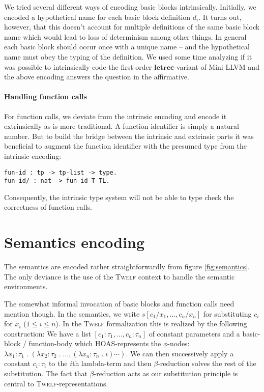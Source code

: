 \documentclass[a4paper, oneside, 10pt, final]{memoir}
\newcommand{\twelf}{\textsc{Twelf}}
\begin{document}
We tried several different ways of encoding basic blocks
intrinsically. Initially, we encoded a hypothetical name for
each basic block definition $d_i$. It turns out, however, that this
doesn't account for multiple definitions of the same basic block
name which would lead to loss of determinism among other
things. In general each basic block should occur once with a unique
name -- and the hypothetical name must obey the typing of the
definition. We used some time analyzing if it was possible to
intrinsically code the first-order $\mathbf{letrec}$-variant of
Mini-LLVM and the above encoding answers the question in the
affirmative.

\paragraph{Handling function calls}

For function calls, we deviate from the intrinsic encoding and encode
it extrinsically as is more traditional. A function identifier is
simply a natural number. But to build the bridge between the intrinsic
and extrinsic parts it was beneficial to augment the function
identifier with the presumed type from the intrinsic encoding:
\begin{verbatim}
fun-id : tp -> tp-list -> type.
fun-id/ : nat -> fun-id T TL.
\end{verbatim}
Consequently, the intrinsic type system will not be able to type check
the correctness of function calls.

\section{Semantics encoding}

The semantics are encoded rather straightforwardly from figure
\ref{fig:semantics}. The only deviance is the use of the \twelf{}
context to handle the semantic environments.

The somewhat informal invocation of basic blocks and function calls
need mention though. In the semantics, we write $s[c_1/x_1, \dotsc,
c_n/x_n]$ for substituting $c_i$ for $x_i$ ($1 \leq i \leq n$). In the
\twelf{} formalization this is realized by the following construction:
We have a list $[c_1 : \tau_1, \dotsc, c_n : \tau_n]$ of constant
parameters and a basic-block / function-body which HOAS-represents the
$\phi$-nodes: $\lambda x_1 : \tau_1 \;.\; (\lambda x_2 : \tau_2 \;.\;
\dotsc, (\lambda x_n : \tau_n \;.\; i)\dotsb{})$. We can then
successively apply a constant $c_i : \tau_i$ to the $i$th lambda-term
and then $\beta$-reduction solves the rest of the substitution. The
fact that $\beta$-reduction acts as our substitution principle is
central to \twelf{}-representations.
\end{document}
